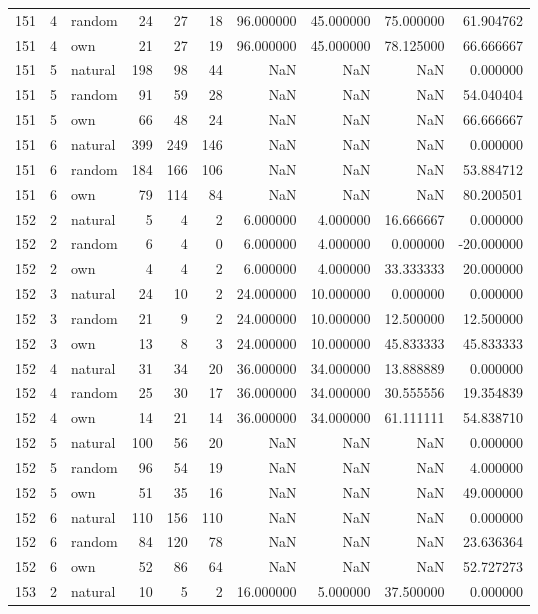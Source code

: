 \begin{table}[htbp]
\begin{tabular}{rrlrrrrrrr}
151 & 4 & random & 24 & 27 & 18 & 96.000000 & 45.000000 & 75.000000 & 61.904762 \\
151 & 4 & own & 21 & 27 & 19 & 96.000000 & 45.000000 & 78.125000 & 66.666667 \\
151 & 5 & natural & 198 & 98 & 44 & NaN & NaN & NaN & 0.000000 \\
151 & 5 & random & 91 & 59 & 28 & NaN & NaN & NaN & 54.040404 \\
151 & 5 & own & 66 & 48 & 24 & NaN & NaN & NaN & 66.666667 \\
151 & 6 & natural & 399 & 249 & 146 & NaN & NaN & NaN & 0.000000 \\
151 & 6 & random & 184 & 166 & 106 & NaN & NaN & NaN & 53.884712 \\
151 & 6 & own & 79 & 114 & 84 & NaN & NaN & NaN & 80.200501 \\
152 & 2 & natural & 5 & 4 & 2 & 6.000000 & 4.000000 & 16.666667 & 0.000000 \\
152 & 2 & random & 6 & 4 & 0 & 6.000000 & 4.000000 & 0.000000 & -20.000000 \\
152 & 2 & own & 4 & 4 & 2 & 6.000000 & 4.000000 & 33.333333 & 20.000000 \\
152 & 3 & natural & 24 & 10 & 2 & 24.000000 & 10.000000 & 0.000000 & 0.000000 \\
152 & 3 & random & 21 & 9 & 2 & 24.000000 & 10.000000 & 12.500000 & 12.500000 \\
152 & 3 & own & 13 & 8 & 3 & 24.000000 & 10.000000 & 45.833333 & 45.833333 \\
152 & 4 & natural & 31 & 34 & 20 & 36.000000 & 34.000000 & 13.888889 & 0.000000 \\
152 & 4 & random & 25 & 30 & 17 & 36.000000 & 34.000000 & 30.555556 & 19.354839 \\
152 & 4 & own & 14 & 21 & 14 & 36.000000 & 34.000000 & 61.111111 & 54.838710 \\
152 & 5 & natural & 100 & 56 & 20 & NaN & NaN & NaN & 0.000000 \\
152 & 5 & random & 96 & 54 & 19 & NaN & NaN & NaN & 4.000000 \\
152 & 5 & own & 51 & 35 & 16 & NaN & NaN & NaN & 49.000000 \\
152 & 6 & natural & 110 & 156 & 110 & NaN & NaN & NaN & 0.000000 \\
152 & 6 & random & 84 & 120 & 78 & NaN & NaN & NaN & 23.636364 \\
152 & 6 & own & 52 & 86 & 64 & NaN & NaN & NaN & 52.727273 \\
153 & 2 & natural & 10 & 5 & 2 & 16.000000 & 5.000000 & 37.500000 & 0.000000 \\

\end{tabular}
\end{table}
